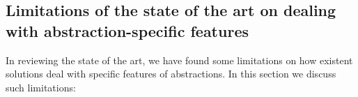 
%
%
%

\subsection{Limitations of the state of the art on dealing with abstraction-specific features}

In reviewing the state of the art, we have found some limitations on how existent solutions deal with specific features of abstractions.
In this section we discuss such limitations:


